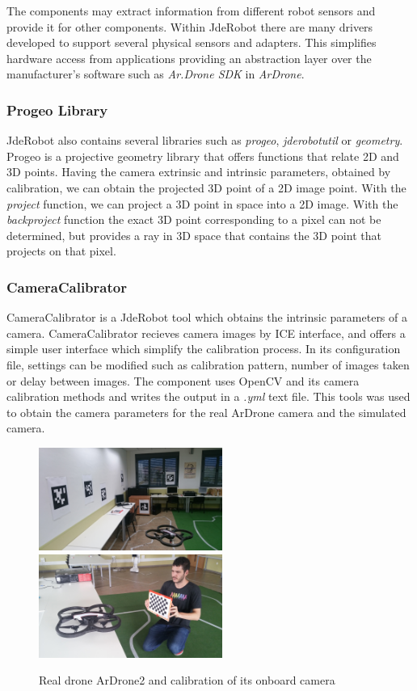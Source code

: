 \documentclass{styles/svproc}
\begin{document}
 The components may extract information from different robot sensors and provide it for other components. Within JdeRobot there are many drivers developed to support several physical sensors and adapters. This simplifies hardware access from applications providing an abstraction layer over the manufacturer's software such as \textit{Ar.Drone SDK} in \textit{ArDrone}. 

        \subsubsection{Progeo Library}
        
        JdeRobot also contains several libraries such as \textit{progeo}, \textit{jderobotutil} or \textit{geometry}. Progeo is a projective geometry library that offers functions that relate 2D and 3D points. Having the camera extrinsic and intrinsic parameters, obtained by calibration, we can obtain the projected 3D point of a 2D image point. With the \textit{project} function, we can project a 3D point in space into a 2D image. With the \textit{backproject} function the exact 3D point corresponding to a pixel can not be determined, but provides a ray in 3D space that contains the 3D point that projects on that pixel.

\subsubsection{CameraCalibrator}

	CameraCalibrator is a JdeRobot tool which obtains the intrinsic parameters of a camera. CameraCalibrator recieves camera images by ICE interface, and offers a simple user interface which simplify the calibration process. In its configuration file, settings can be modified such as calibration pattern, number of images taken or delay between images. The component uses OpenCV and its camera calibration methods and writes the output in a \textit{.yml} text file. This tools was used to obtain the camera parameters for the real ArDrone camera and the simulated camera.

	\begin{figure}[h]
		\begin{center}
                  {\includegraphics[width=6cm]{realnavigation.png}}
                  {\includegraphics[width=6cm]{calibration.jpg}}
		\end{center}
		\caption{Real drone ArDrone2 and calibration of its onboard camera}
	\end{figure}
\end{document}
